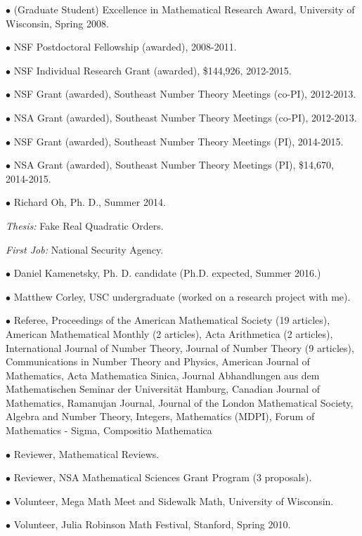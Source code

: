 \documentclass{article}
\newcommand{\categorywidth}{1in}        %
\newcommand{\categorysep}{5pt}
\newcommand{\catlistlabel}[1]%
{\raisebox{0pt}[1ex][0pt]{\makebox[\labelwidth][l]%
    {\parbox[t]{\labelwidth}{\hspace{0pt}\textbf{#1}}}}}
\newenvironment{categories}{\begin{list}{}{
      \setlength{\labelwidth}{\categorywidth}
      \setlength{\leftmargin}{\labelwidth}
      \addtolength{\leftmargin}{\labelsep}
      \setlength{\topsep}{20pt}
      \setlength{\itemsep}{\categorysep}
      \renewcommand{\makelabel}{\catlistlabel}
      }}{\end{list}}
\newcommand{\category}[1]{\item[#1]}
\begin{document}
\begin{flushleft}
\begin{categories}
{  $\bullet$ {(Graduate Student) Excellence in Mathematical Research Award, University of Wisconsin, Spring 2008.}

  $\bullet$ {NSF Postdoctoral Fellowship (awarded), 2008-2011.}

  $\bullet$ {NSF Individual Research Grant (awarded), \$144,926, 2012-2015.}

  $\bullet$ {NSF Grant (awarded), Southeast Number Theory Meetings (co-PI), 2012-2013.}

  $\bullet$ {NSA Grant (awarded), Southeast Number Theory Meetings (co-PI), 2012-2013.}

  $\bullet$ {NSF Grant (awarded), Southeast Number Theory Meetings (PI), 2014-2015.}

  $\bullet$ {NSA Grant (awarded), Southeast Number Theory Meetings (PI), \$14,670, 2014-2015.}

\category{Students \\ Supervised}
$\bullet$ Richard Oh, Ph. D., Summer 2014.

\vskip -0.12cm
\hskip 0.5cm
{\itshape Thesis:} Fake Real Quadratic Orders.

\vskip -0.12cm
\hskip 0.5cm
{\itshape First Job:} National Security Agency.

$\bullet$ Daniel Kamenetsky, Ph. D. candidate (Ph.D. expected, Summer 2016.)

$\bullet$ Matthew Corley, USC undergraduate (worked on a research project with me).

\category{Professional Service} 
$\bullet$ {Referee, Proceedings of the American Mathematical Society (19 articles),
American Mathematical Monthly (2 articles),
Acta Arithmetica (2 articles),
International Journal of Number Theory, 
Journal of Number Theory (9 articles), 
Communications in Number Theory and Physics,
American Journal of Mathematics, Acta Mathematica Sinica,
Journal Abhandlungen aus dem Mathematischen Seminar der Universit\"at Hamburg,
Canadian Journal of Mathematics,
Ramanujan Journal,
Journal of the London Mathematical Society,
Algebra and Number Theory,
Integers,
Mathematics (MDPI),
Forum of Mathematics - Sigma,
Compositio Mathematica}

$\bullet$ {Reviewer, Mathematical Reviews.}

$\bullet$ {Reviewer, NSA Mathematical Sciences Grant Program (3 proposals).}

$\bullet$ {Volunteer, Mega Math Meet and Sidewalk Math, University of Wisconsin.}

$\bullet$ {Volunteer, Julia Robinson Math Festival, Stanford, Spring 2010.}
 
}
\end{categories}
\end{flushleft}
\end{document}
